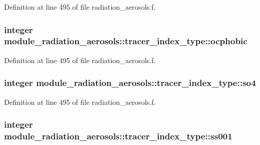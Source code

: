 Definition at line 495 of file radiation\+\_\+aerosols.\+f.

\subsubsection[{\texorpdfstring{ocphobic}{ocphobic}}]{\setlength{\rightskip}{0pt plus 5cm}integer module\+\_\+radiation\+\_\+aerosols\+::tracer\+\_\+index\+\_\+type\+::ocphobic\hspace{0.3cm}{\ttfamily [private]}}\hypertarget{structmodule__radiation__aerosols_1_1tracer__index__type_a3ace1c1bbade423efd216e676511c470}{}\label{structmodule__radiation__aerosols_1_1tracer__index__type_a3ace1c1bbade423efd216e676511c470}


Definition at line 495 of file radiation\+\_\+aerosols.\+f.

\subsubsection[{\texorpdfstring{so4}{so4}}]{\setlength{\rightskip}{0pt plus 5cm}integer module\+\_\+radiation\+\_\+aerosols\+::tracer\+\_\+index\+\_\+type\+::so4\hspace{0.3cm}{\ttfamily [private]}}\hypertarget{structmodule__radiation__aerosols_1_1tracer__index__type_aa73b4be9d303cfce2c00407204c5f930}{}\label{structmodule__radiation__aerosols_1_1tracer__index__type_aa73b4be9d303cfce2c00407204c5f930}


Definition at line 495 of file radiation\+\_\+aerosols.\+f.

\subsubsection[{\texorpdfstring{ss001}{ss001}}]{\setlength{\rightskip}{0pt plus 5cm}integer module\+\_\+radiation\+\_\+aerosols\+::tracer\+\_\+index\+\_\+type\+::ss001\hspace{0.3cm}{\ttfamily [private]}}\hypertarget{structmodule__radiation__aerosols_1_1tracer__index__type_acce0ecff4d4e84dffc0c23965053ac36}{}\label{structmodule__radiation__aerosols_1_1tracer__index__type_acce0ecff4d4e84dffc0c23965053ac36}


